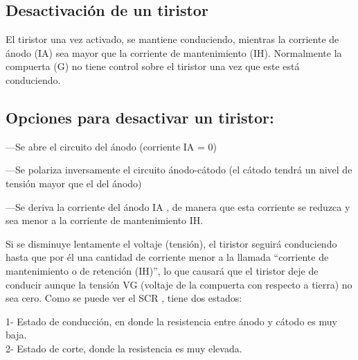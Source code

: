 \documentclass[12pt,a4paper]{article}
\begin{document}
\begin{center}
\subsection{Desactivación de un tiristor}
\end{center}
El tiristor una vez activado, se mantiene conduciendo, mientras la corriente de ánodo (IA) sea mayor que la corriente de mantenimiento (IH). Normalmente la compuerta (G) no tiene control sobre el tiristor una vez que este está conduciendo.
\newpage
\begin{center}
\subsection{Opciones para desactivar un tiristor:}
\end{center}
\begin{flushleft}
—Se abre el circuito del ánodo (corriente IA = 0)

—Se polariza inversamente el circuito ánodo-cátodo (el cátodo tendrá un nivel de tensión mayor que el del ánodo)

—Se deriva la corriente del ánodo IA , de manera que esta corriente se reduzca y sea menor a la corriente de mantenimiento IH.\linebreak

Si se disminuye lentamente el voltaje (tensión), el tiristor seguirá conduciendo hasta que por él una cantidad de corriente menor a la llamada “corriente de mantenimiento o de retención (IH)”, lo que causará que el tiristor deje de conducir aunque la tensión VG (voltaje de la compuerta con respecto a tierra) no sea cero. Como se puede ver el SCR , tiene dos estados:\linebreak

1- Estado de conducción, en donde la resistencia entre ánodo y cátodo es muy baja.\\
2- Estado de corte, donde la resistencia es muy elevada.\\
\end{flushleft}
\end{document}
